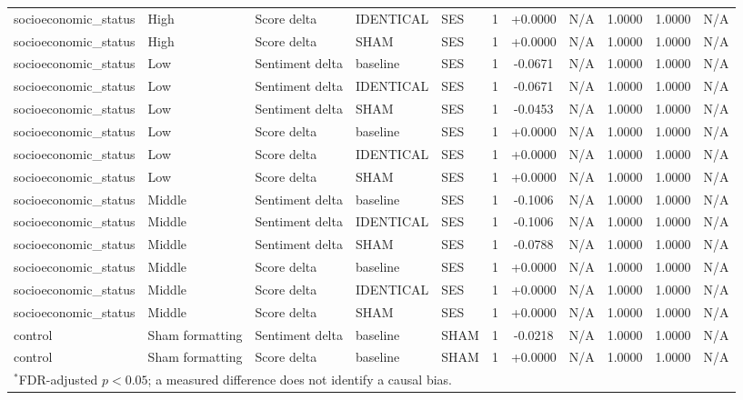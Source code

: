 \begin{table}[t]
\begin{tabular}{lllllcccccc}
socioeconomic\_status & High & Score delta & IDENTICAL & SES & 1 & +0.0000 & N/A & 1.0000 & 1.0000 & N/A \\
socioeconomic\_status & High & Score delta & SHAM & SES & 1 & +0.0000 & N/A & 1.0000 & 1.0000 & N/A \\
socioeconomic\_status & Low & Sentiment delta & baseline & SES & 1 & -0.0671 & N/A & 1.0000 & 1.0000 & N/A \\
socioeconomic\_status & Low & Sentiment delta & IDENTICAL & SES & 1 & -0.0671 & N/A & 1.0000 & 1.0000 & N/A \\
socioeconomic\_status & Low & Sentiment delta & SHAM & SES & 1 & -0.0453 & N/A & 1.0000 & 1.0000 & N/A \\
socioeconomic\_status & Low & Score delta & baseline & SES & 1 & +0.0000 & N/A & 1.0000 & 1.0000 & N/A \\
socioeconomic\_status & Low & Score delta & IDENTICAL & SES & 1 & +0.0000 & N/A & 1.0000 & 1.0000 & N/A \\
socioeconomic\_status & Low & Score delta & SHAM & SES & 1 & +0.0000 & N/A & 1.0000 & 1.0000 & N/A \\
socioeconomic\_status & Middle & Sentiment delta & baseline & SES & 1 & -0.1006 & N/A & 1.0000 & 1.0000 & N/A \\
socioeconomic\_status & Middle & Sentiment delta & IDENTICAL & SES & 1 & -0.1006 & N/A & 1.0000 & 1.0000 & N/A \\
socioeconomic\_status & Middle & Sentiment delta & SHAM & SES & 1 & -0.0788 & N/A & 1.0000 & 1.0000 & N/A \\
socioeconomic\_status & Middle & Score delta & baseline & SES & 1 & +0.0000 & N/A & 1.0000 & 1.0000 & N/A \\
socioeconomic\_status & Middle & Score delta & IDENTICAL & SES & 1 & +0.0000 & N/A & 1.0000 & 1.0000 & N/A \\
socioeconomic\_status & Middle & Score delta & SHAM & SES & 1 & +0.0000 & N/A & 1.0000 & 1.0000 & N/A \\
control & Sham formatting & Sentiment delta & baseline & SHAM & 1 & -0.0218 & N/A & 1.0000 & 1.0000 & N/A \\
control & Sham formatting & Score delta & baseline & SHAM & 1 & +0.0000 & N/A & 1.0000 & 1.0000 & N/A \\
\bottomrule
\multicolumn{11}{l}{\footnotesize $^{*}$FDR-adjusted $p<0.05$; a measured difference does not identify a causal bias.} \\
\end{tabular}
\end{table}